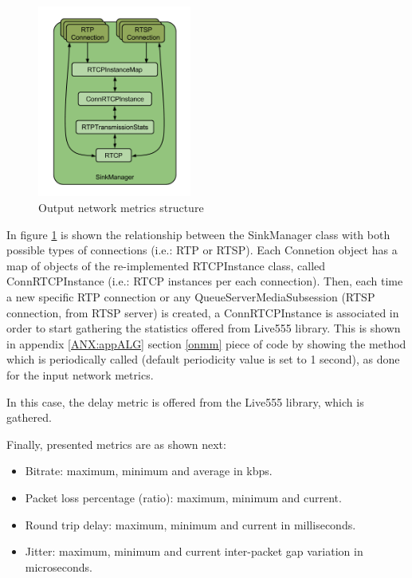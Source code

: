 \begin{figure}[!htb]
\begin{center}
\includegraphics[width=0.45\textwidth]{./images/SinkManager.png}
\caption{Output network metrics structure}
\label{F:onms}
\end{center}
\end{figure}

In figure \ref{F:onms} is shown the relationship between the SinkManager class with both possible types of connections (i.e.: RTP or RTSP). Each Connetion object has a map of objects of the re-implemented RTCPInstance class, called ConnRTCPInstance (i.e.: RTCP instances per each connection). Then, each time a new specific RTP connection or any QueueServerMediaSubsession (RTSP connection, from RTSP server) is created, a ConnRTCPInstance is associated in order to start gathering the statistics offered from Live555 library. This is shown in appendix \ref{ANX:appALG} section \ref{onmm} piece of code by showing the method which is periodically called (default periodicity value is set to 1 second), as done for the input network metrics.

In this case, the delay metric is offered from the Live555 library, which is gathered.

Finally, presented metrics are as shown next:

\begin{itemize}
\item Bitrate: maximum, minimum and average in kbps.
\item Packet loss percentage (ratio): maximum, minimum and current.
\item Round trip delay: maximum, minimum and current in milliseconds.
\item Jitter: maximum, minimum and current inter-packet gap variation in microseconds.
\end{itemize}

